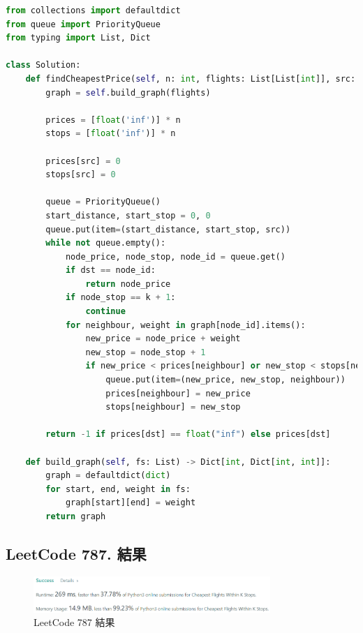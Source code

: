 \documentclass[10pt,UTF8]{ctexart}
\begin{document}
\begin{lstlisting}[language={python}]
from collections import defaultdict
from queue import PriorityQueue
from typing import List, Dict

class Solution:
    def findCheapestPrice(self, n: int, flights: List[List[int]], src: int, dst: int, k: int) -> int:
        graph = self.build_graph(flights)

        prices = [float('inf')] * n
        stops = [float('inf')] * n

        prices[src] = 0
        stops[src] = 0

        queue = PriorityQueue()
        start_distance, start_stop = 0, 0
        queue.put(item=(start_distance, start_stop, src))
        while not queue.empty():
            node_price, node_stop, node_id = queue.get()
            if dst == node_id:
                return node_price
            if node_stop == k + 1:
                continue
            for neighbour, weight in graph[node_id].items():
                new_price = node_price + weight
                new_stop = node_stop + 1
                if new_price < prices[neighbour] or new_stop < stops[neighbour]:
                    queue.put(item=(new_price, new_stop, neighbour))
                    prices[neighbour] = new_price
                    stops[neighbour] = new_stop

        return -1 if prices[dst] == float("inf") else prices[dst]

    def build_graph(self, fs: List) -> Dict[int, Dict[int, int]]:
        graph = defaultdict(dict)
        for start, end, weight in fs:
            graph[start][end] = weight
        return graph
\end{lstlisting}



\subsection{LeetCode 787. 結果}

\begin{figure}[H]
\centering 
\includegraphics[width=0.80\textwidth]{lc-787-o.png} 
\caption{LeetCode 787 結果}
\label{Test}
\end{figure}


\newpage
\end{document}
